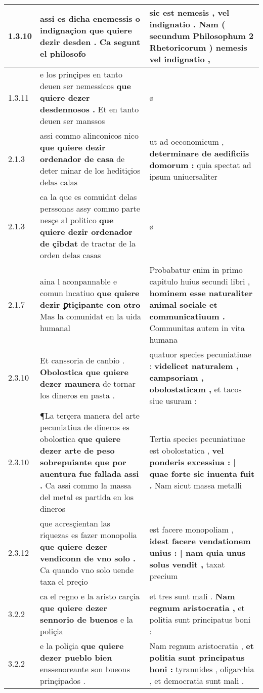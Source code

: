 \begin{tabular}{|p{1cm}|p{6.5cm}|p{6.5cm}|}
1.3.10 & assi es dicha enemessis o indignaçion \textbf{ que quiere dezir desden . } Ca segunt el philosofo & sic est nemesis , vel indignatio . \textbf{ Nam ( secundum Philosophum 2 Rhetoricorum ) } nemesis vel indignatio , \\\hline
1.3.11 & e los prinçipes en tanto deuen ser nemessicos \textbf{ que quiere dezer desdennosos . } Et en tanto deuen ser manssos & ø \\\hline
2.1.3 & assi commo alinconicos nico \textbf{ que quiere dezir ordenador de casa } de deter minar de los heditiçios delas calas & ut ad oeconomicum , \textbf{ determinare de aedificiis domorum : } quia spectat ad ipsum uniuersaliter \\\hline
2.1.3 & ca la que es comuidat delas perssonas assy commo parte nesçe al politico \textbf{ que quiere dezir ordenador de çibdat } de tractar de la orden delas casas & ø \\\hline
2.1.7 & aina l aconpannable e comun incatiuo \textbf{ que quiere dezir ꝑtiçipante con otro } Mas la comunidat en la uida humanal & Probabatur enim in primo capitulo huius secundi libri , \textbf{ hominem esse naturaliter animal sociale et communicatiuum . } Communitas autem in vita humana \\\hline
2.3.10 & Et canssoria de canbio . \textbf{ Obolostica que quiere dezer maunera } de tornar los dineros en pasta . & quatuor species pecuniatiuae : \textbf{ videlicet naturalem , campsoriam , obolostaticam , } et tacos siue usuram : \\\hline
2.3.10 & ¶La terçera manera del arte pecuniatiua de dineros es obolostica \textbf{ que quiere dezer arte de peso sobrepuiante que por auentura fue fallada assi . } Ca assi commo la massa del metal es partida en los dineros & Tertia species pecuniatiuae est obolostatica , \textbf{ vel ponderis excessiua : | quae forte sic inuenta fuit . } Nam sicut massa metalli \\\hline
2.3.12 & que acresçientan las riquezas es fazer monopolia \textbf{ que quiere dezer vendiconn de vno solo . } Ca quando vno solo uende taxa el preçio & est facere monopoliam , \textbf{ idest facere vendationem unius : | nam quia unus solus vendit , } taxat precium \\\hline
3.2.2 & ca el regno e la aristo carçia \textbf{ que quiere dezer sennorio de buenos } e la poliçia & et tres sunt mali . \textbf{ Nam regnum aristocratia , } et politia sunt principatus boni : \\\hline
3.2.2 & e la poliçia \textbf{ que quiere dezer pueblo bien } enssenoreante son bueons prinçipados . & Nam regnum aristocratia , \textbf{ et politia sunt principatus boni : } tyrannides , oligarchia , et democratia sunt mali . \\\hline

\end{tabular}
